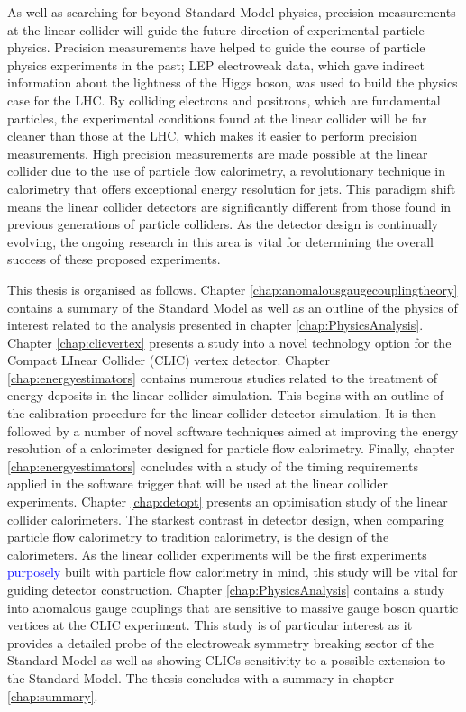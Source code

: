 As well as searching for beyond Standard Model physics, precision measurements at the linear collider will guide the future direction of experimental particle physics.  Precision measurements have helped to guide the course of particle physics experiments in the past; LEP electroweak data, which gave indirect information about the lightness of the Higgs boson, was used to build the physics case for the LHC.  By colliding electrons and positrons, which are fundamental particles, the experimental conditions found at the linear collider will be far cleaner than those at the LHC, which makes it easier to perform precision measurements.  High precision measurements are made possible at the linear collider due to the use of particle flow calorimetry, a revolutionary technique in calorimetry that offers exceptional energy resolution for jets.  This paradigm shift means the linear collider detectors are significantly different from those found in previous generations of particle colliders.  As the detector design is continually evolving, the ongoing research in this area is vital for determining the overall success of these proposed experiments.  

This thesis is organised as follows.  Chapter \ref{chap:anomalousgaugecouplingtheory} contains a summary of the Standard Model as well as an outline of the physics of interest related to the analysis presented in chapter \ref{chap:PhysicsAnalysis}.  Chapter \ref{chap:clicvertex} presents a study into a novel technology option for the Compact LInear Collider (CLIC) vertex detector.  Chapter \ref{chap:energyestimators} contains numerous studies related to the treatment of energy deposits in the linear collider simulation.  This begins with an outline of the calibration procedure for the linear collider detector simulation.  It is then followed by a number of novel software techniques aimed at improving the energy resolution of a calorimeter designed for particle flow calorimetry.  Finally, chapter \ref{chap:energyestimators} concludes with a study of the timing requirements applied in the software trigger that will be used at the linear collider experiments.  Chapter \ref{chap:detopt} presents an optimisation study of the linear collider calorimeters.  The starkest contrast in detector design, when comparing particle flow calorimetry to tradition calorimetry, is the design of the calorimeters.  As the linear collider experiments will be the first experiments \textcolor{blue}{purposely} built with particle flow calorimetry in mind, this study will be vital for guiding detector construction.  Chapter \ref{chap:PhysicsAnalysis} contains a study into anomalous gauge couplings that are sensitive to massive gauge boson quartic vertices at the CLIC experiment.  This study is of particular interest as it provides a detailed probe of the electroweak symmetry breaking sector of the Standard Model as well as showing CLICs sensitivity to a possible extension to the Standard Model.  The thesis concludes with a summary in chapter \ref{chap:summary}.

